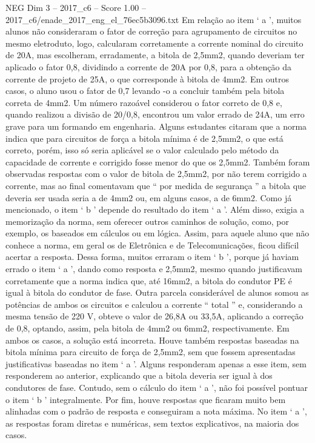 \begin{textsample}{NEG Dim 3 – 2017\_c6 – Score 1.00 – 2017\_c6/enade\_2017\_eng\_el\_76ec5b3096.txt}
Em relação ao item ‘ a ’, muitos alunos não consideraram o fator de correção para agrupamento de circuitos no mesmo eletroduto, logo, calcularam corretamente a corrente nominal do circuito de 20A, mas escolheram, erradamente, a bitola de 2,5mm2, quando deveriam ter aplicado o fator 0,8, dividindo a corrente de 20A por 0,8, para a obtenção da corrente de projeto de 25A, o que corresponde à bitola de 4mm2.
Em outros casos, o aluno usou o fator de 0,7 levando -o a concluir também pela bitola correta de 4mm2.
Um número razoável considerou o fator correto de 0,8 e, quando realizou a divisão de 20/0,8, encontrou um valor errado de 24A, um erro grave para um formando em engenharia.
Alguns estudantes citaram que a norma indica que para circuitos de força a bitola mínima é de 2,5mm2, o que está correto, porém, isso só seria aplicável se o valor calculado pelo método da capacidade de corrente e corrigido fosse menor do que os 2,5mm2.
Também foram observadas respostas com o valor de bitola de 2,5mm2, por não terem corrigido a corrente, mas ao final comentavam que “ por medida de segurança ” a bitola que deveria ser usada seria a de 4mm2 ou, em alguns casos, a de 6mm2.
Como já mencionado, o item ‘ b ’ depende do resultado do item ‘ a ’.
Além disso, exigia a memorização da norma, sem oferecer outros caminhos de solução, como, por exemplo, os baseados em cálculos ou em lógica.
Assim, para aquele aluno que não conhece a norma, em geral os de Eletrônica e de Telecomunicações, ficou difícil acertar a resposta.
Dessa forma, muitos erraram o item ‘ b ’, porque já haviam errado o item ‘ a ’, dando como resposta e 2,5mm2, mesmo quando justificavam corretamente que a norma indica que, até 16mm2, a bitola do condutor PE é igual à bitola do condutor de fase.
Outra parcela considerável de alunos somou as potências de ambos os circuitos e calculou a corrente “ total ” e, considerando a mesma tensão de 220 V, obteve o valor de 26,8A ou 33,5A, aplicando a correção de 0,8, optando, assim, pela bitola de 4mm2 ou 6mm2, respectivamente.
Em ambos os casos, a solução está incorreta.
Houve também respostas baseadas na bitola mínima para circuito de força de 2,5mm2, sem que fossem apresentadas justificativas baseadas no item ‘ a ’.
Alguns responderam apenas a esse item, sem responderem ao anterior, explicando que a bitola deveria ser igual à dos condutores de fase.
Contudo, sem o cálculo do item ‘ a ’, não foi possível pontuar o item ‘ b ’ integralmente.
Por fim, houve respostas que ficaram muito bem alinhadas com o padrão de resposta e conseguiram a nota máxima.
No item ‘ a ’, as respostas foram diretas e numéricas, sem textos explicativos, na maioria dos casos.

\end{textsample}
